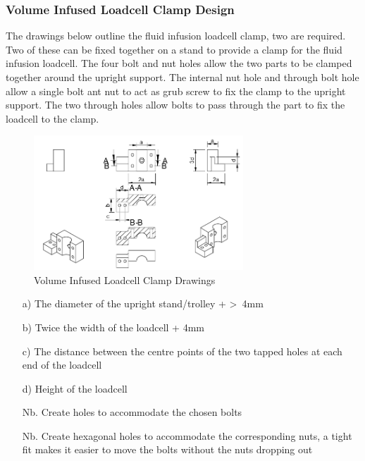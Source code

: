 \subsubsection{Volume Infused Loadcell Clamp Design}

The drawings below outline the fluid infusion loadcell clamp, two are required. Two of these can be fixed together on a stand to provide a clamp for the fluid infusion loadcell.
The four bolt and nut holes allow the two parts to be clamped together around the upright support. The internal nut hole and through bolt hole allow a single bolt ant nut to act as grub screw to fix the clamp to the upright support. The two through holes allow bolts to pass through the part to fix the loadcell to the clamp.


\begin{figure}[h]
    \centering
    \includegraphics[width=0.7\textwidth]{Figures/SupportDrawings/vol_inf_loadcell_clamp_drawing.png}
    \caption{Volume Infused Loadcell Clamp Drawings}
    \label{fig:viloadcellclampdrawing}
  \end{figure}

\begin{enumerate}
  \item[a)] The diameter of the upright stand/trolley + \textgreater\ 4mm
  \item[b)] Twice the width of the loadcell + 4mm
  \item[c)] The distance between the centre points of the two tapped holes at each end of the loadcell
  \item[d)] Height of the loadcell
  \item[Nb.] Create holes to accommodate the chosen bolts
  \item[Nb.] Create hexagonal holes to accommodate the corresponding nuts, a tight fit makes it easier to move the bolts without the nuts dropping out
\end{enumerate}